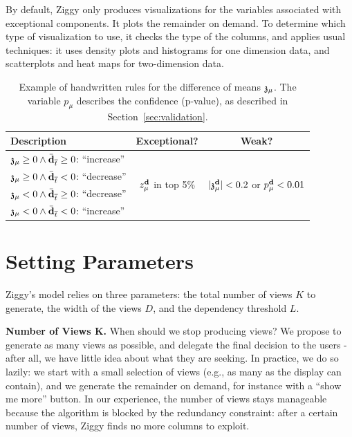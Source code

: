 By default, Ziggy only produces visualizations for the variables associated
with exceptional components. It plots the remainder on demand. To determine
which type of visualization to use, it checks the type of the columns, and
applies usual techniques: it uses density plots and histograms for one
dimension data, and scatterplots and heat maps for two-dimension data.
\begin{table}[t!]
    \centering
    \begin{tabular}{| p{4cm} | c | c |}
      \hline
      Description & Exceptional? & Weak?\\
      \hline
      $\mathfrak{z_\mu} \geq 0 \wedge \bar{\mathbf{d}}_{\overline{t}} \geq 0$: ``increase'' &
          \multirow{4}{1.2cm}{$z_\mu^{\bf{d}}$ in top 5\%} & 
              \multirow{4}{1.5cm}{$|\mathfrak{z_\mu^{\bf{d}}}| < 0.2$ or $p_\mu^{\bf{d}} < 0.01$}\\
      $\mathfrak{z_\mu} \geq 0 \wedge \bar{\mathbf{d}}_{\overline{t}} < 0$: ``decrease'' & &\\
      $\mathfrak{z_\mu} < 0 \wedge \bar{\mathbf{d}}_{\overline{t}} \geq0$: ``decrease'' & &\\
      $\mathfrak{z_\mu} < 0 \wedge \bar{\mathbf{d}}_{\overline{t}} < 0$: ``increase'' & &\\
      \hline
    \end{tabular}
    \caption{Example of handwritten rules for the difference of means
    $\mathfrak{z_\mu}$. The variable $p_\mu$ describes the confidence (p-value), as
described in Section~\ref{sec:validation}.} 
\label{tab:handwritten}
\end{table}


\section{Setting Parameters}
\label{sec:parameters}

Ziggy's model relies on three parameters: the total number of views $K$ to
generate, the width of the views $D$, and the dependency threshold $L$. 

\textbf{Number of Views K.} When should we stop producing views? We propose to
generate as many views as possible, and delegate the final decision to the
users - after all, we have little idea about what they are seeking. In
practice, we do so lazily: we start with a small selection of views (e.g., as
many as the display can contain), and we generate the remainder on demand, for
instance with a ``show me more'' button.  In our experience, the number of
views stays manageable because the algorithm is blocked by the redundancy
constraint: after a certain number of views, Ziggy finds no more columns to
exploit.

